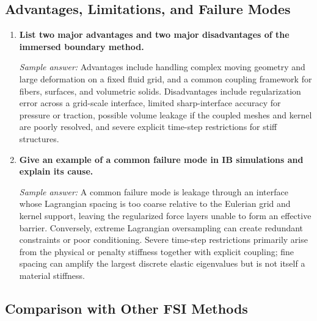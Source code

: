 \documentclass[12pt]{article}
\begin{document}
\subsection*{Advantages, Limitations, and Failure Modes}

\begin{enumerate}[resume]
\item \textbf{List two major advantages and two major disadvantages of the immersed boundary method.}

\textit{Sample answer:}
Advantages include handling complex moving geometry and large deformation on a
fixed fluid grid, and a common coupling framework for fibers, surfaces, and
volumetric solids. Disadvantages include regularization error across a
grid-scale interface, limited sharp-interface accuracy for pressure or traction,
possible volume leakage if the coupled meshes and kernel are poorly resolved,
and severe explicit time-step restrictions for stiff structures.

\item \textbf{Give an example of a common failure mode in IB simulations and explain its cause.}

\textit{Sample answer:}
A common failure mode is leakage through an interface whose Lagrangian spacing
is too coarse relative to the Eulerian grid and kernel support, leaving the
regularized force layers unable to form an effective barrier. Conversely,
extreme Lagrangian oversampling can create redundant constraints or poor
conditioning. Severe time-step restrictions primarily arise from the physical
or penalty stiffness together with explicit coupling; fine spacing can amplify
the largest discrete elastic eigenvalues but is not itself a material stiffness.
\end{enumerate}

\subsection*{Comparison with Other FSI Methods}
\end{document}
